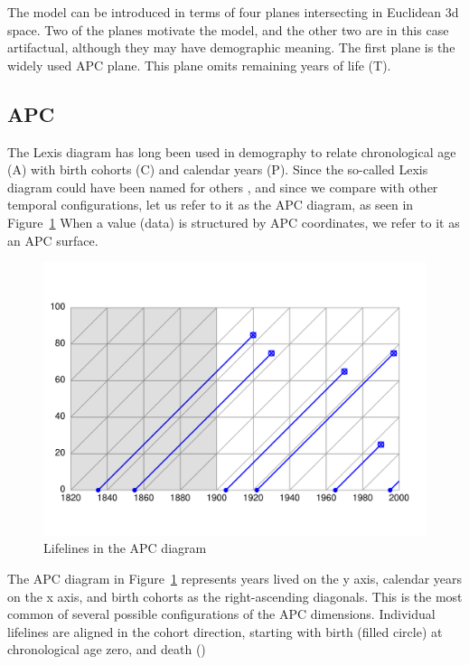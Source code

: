 \documentclass[onehalfspacing]{article}
\begin{document}
The  model can be introduced in terms of four planes intersecting in
Euclidean 3d space. Two of the planes motivate the model, and the other two
are in this case artifactual, although they may have demographic meaning. The
first plane is the widely used APC plane. This plane omits remaining years of
life (T). 

\subsection*{APC}
The Lexis diagram has long been used in demography to relate chronological age
(A) with birth cohorts (C) and calendar years (P). Since the so-called Lexis
diagram could have been named for others
\citep{vandeschrick2001lexis,keiding2011age}, and since we compare with other
temporal configurations, let us refer to it as the APC diagram, as seen in
Figure~\ref{APCright}
When a value (data) is structured by APC coordinates, we refer to it as an APC surface.

\begin{figure}[b!]
    \centering
    \includegraphics[scale=.7]{Figures/LabPres/APC2.pdf}
    \caption{Lifelines in the APC diagram}
    \label{APCright}
\end{figure} 

The APC diagram in Figure~\ref{APCright} represents years lived on the y axis,
calendar years on the x axis, and birth cohorts as the right-ascending
diagonals. This is the most common of several possible configurations
of the APC dimensions. Individual lifelines are aligned in the cohort direction,
starting with birth (filled circle) at chronological age zero, and death ()
\end{document}
